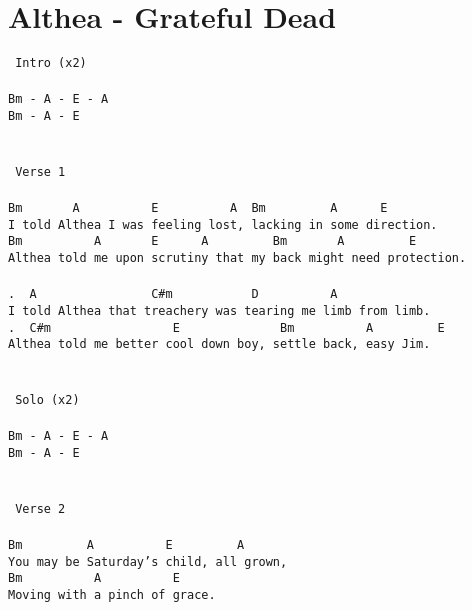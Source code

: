 \newpage
\section{Althea - Grateful Dead}
\label{Althea - Grateful Dead}
\texttt{\lbrack\ Intro\rbrack\ (x2)\\
\\
Bm\ -\ A\ -\ E\ -\ A\\
Bm\ -\ A\ -\ E\\
\\
\\
\lbrack\ Verse\ 1\rbrack\\
\\
Bm\ \ \ \ \ \ \ A\ \ \ \ \ \ \ \ \ \ E\ \ \ \ \ \ \ \ \ \ A\ \ Bm\ \ \ \ \ \ \ \ \ A\ \ \ \ \ \ E\\
I\ told\ Althea\ I\ was\ feeling\ lost,\ lacking\ in\ some\ direction.\\
Bm\ \ \ \ \ \ \ \ \ \ A\ \ \ \ \ \ \ E\ \ \ \ \ \ A\ \ \ \ \ \ \ \ \ Bm\ \ \ \ \ \ \ A\ \ \ \ \ \ \ \ \ E\\
Althea\ told\ me\ upon\ scrutiny\ that\ my\ back\ might\ need\ protection.\\
\\
. \ A\ \ \ \ \ \ \ \ \ \ \ \ \ \ \ \ C\#m\ \ \ \ \ \ \ \ \ \ \ D\ \ \ \ \ \ \ \ \ \ A\\
I\ told\ Althea\ that\ treachery\ was\ tearing\ me\ limb\ from\ limb.\\
. \ C\#m\ \ \ \ \ \ \ \ \ \ \ \ \ \ \ \ \ E\ \ \ \ \ \ \ \ \ \ \ \ \ \ Bm\ \ \ \ \ \ \ \ \ \ A\ \ \ \ \ \ \ \ \ E\\
Althea\ told\ me\ better\ cool\ down\ boy,\ settle\ back,\ easy\ Jim.\\
\\
\\
\lbrack\ Solo\rbrack\ (x2)\\
\\
Bm\ -\ A\ -\ E\ -\ A\\
Bm\ -\ A\ -\ E\\
\\
\\
\lbrack\ Verse\ 2\rbrack\\
\\
Bm\ \ \ \ \ \ \ \ \ A\ \ \ \ \ \ \ \ \ \ E\ \ \ \ \ \ \ \ \ A\\
You\ may\ be\ Saturday's\ child,\ all\ grown,\ \\
Bm\ \ \ \ \ \ \ \ \ \ A\ \ \ \ \ \ \ \ \ \ E\\
Moving\ with\ a\ pinch\ of\ grace.\\
}
